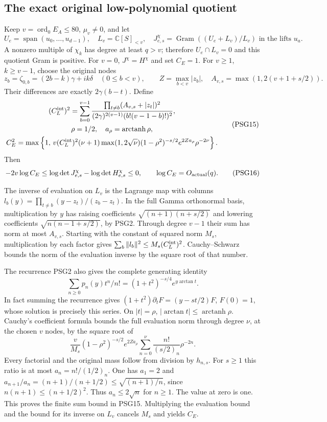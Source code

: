 \documentclass[10pt]{article}
\begin{document}
\subsection{The exact original low-polynomial quotient}
Keep \(v=\operatorname{ord}_0E_A\le80\), \(\mu_v\ne0\), and let
\[
 U_e=\operatorname{span}(u_0,\ldots,u_{d-1}),\quad
 L_v=\mathbb C[S]_{<v},\quad
 J^\chi_{e,s}=\operatorname{Gram}((U_e+L_v)/L_v)
                           \text{ in the lifts }u_a.
 \tag{PSG14}
\]
A nonzero multiple of \(\chi_k\) has degree at least \(q>v\);
therefore \(U_e\cap L_v=0\) and this quotient Gram is positive.
For \(v=0\), \(J^\chi=H^\chi\) and set \(C_E=1\).
For \(v\ge1\), \(k\ge v-1\), choose the original nodes
\[
 z_b=\zeta_{0,b}=(2b-k)\gamma+ik\delta\quad(0\le b<v),\qquad
 Z=\max_{b<v}|z_b|,\quad A_{v,s}=\max(1,2(v+1+s/2)).
\]
Their differences are exactly \(2\gamma(b-t)\). Define
\[
\begin{gathered}
 (C_L^{\rm int})^2=
 \sum_{b=0}^{v-1}
 \frac{\prod_{t\ne b}(A_{v,s}+|z_t|)^2}
 {(2\gamma)^{2(v-1)}(b!(v-1-b)!)^2},\\
 \rho=1/2,\quad a_\rho=\operatorname{arctanh}\rho,\\
 C_E^2=\max\left\{1,\,
 v(C_L^{\rm int})^2(\nu+1)\max(1,2\sqrt{\nu})
 (1-\rho^2)^{-s/2}e^{2Za_\rho}\rho^{-2\nu}\right\}.
\end{gathered}\tag{PSG15}
\]
Then
\[
 -2v\log C_E\le\log\det J^\chi_{e,s}-\log\det H^\chi_{e,s}
       \le0,\qquad \log C_E=O_{\rm actual}(q).
 \tag{PSG16}
\]

The inverse of evaluation on \(L_v\) is the Lagrange map with
columns \(l_b(y)=\prod_{t\ne b}(y-z_t)/(z_b-z_t)\).
In the full Gamma orthonormal basis, multiplication by \(y\)
has raising coefficients \(\sqrt{(n+1)(n+s/2)}\) and lowering
coefficients \(\sqrt{n(n-1+s/2)}\), by PSG2.
Through degree \(v-1\) their sum has norm at most \(A_{v,s}\).
Starting with the constant of squared norm \(M_s\), multiplication
by each factor gives
\(\sum_b\|l_b\|^2\le M_s(C_L^{\rm int})^2\).
Cauchy--Schwarz bounds the norm of the evaluation inverse by
the square root of that number.

The recurrence PSG2 also gives the complete generating identity
\[
 \sum_{n\ge0}p_n(y)t^n/n!=(1+t^2)^{-s/4}e^{y\arctan t}.
\]
In fact summing the recurrence gives
\((1+t^2)\partial_tF=(y-st/2)F\), \(F(0)=1\), whose solution
is precisely this series. On \(|t|=\rho\),
\(|\arctan t|\le\operatorname{arctanh}\rho\).
Cauchy's coefficient formula bounds the full evaluation norm
through degree \(\nu\), at the chosen \(v\) nodes, by the square root of
\[
 \frac{v}{M_s}(1-\rho^2)^{-s/2}e^{2Za_\rho}
                  \sum_{n=0}^{\nu}\frac{n!}{(s/2)_n}\rho^{-2n}.
 \tag{PSG17}
\]
Every factorial and the original mass follow from division by
\(h_{n,s}\).
For \(s\ge1\) this ratio is at most \(a_n=n!/(1/2)_n\).
One has \(a_1=2\) and
\(a_{n+1}/a_n=(n+1)/(n+1/2)\le\sqrt{(n+1)/n}\), since
\(n(n+1)\le(n+1/2)^2\). Thus \(a_n\le2\sqrt n\) for \(n\ge1\).
The value at zero is one. This proves the finite sum bound in
PSG15. Multiplying the evaluation bound and the bound for its
inverse on \(L_v\) cancels \(M_s\) and yields \(C_E\).
\end{document}
